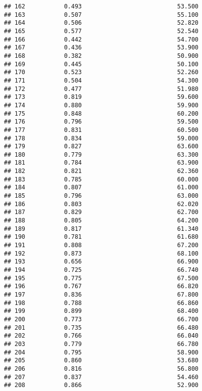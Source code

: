 \documentclass[
]{article}
\begin{document}
\begin{verbatim}
## 162           0.493                           53.500
## 163           0.507                           55.100
## 164           0.506                           52.820
## 165           0.577                           52.540
## 166           0.442                           54.700
## 167           0.436                           53.900
## 168           0.382                           50.900
## 169           0.445                           50.100
## 170           0.523                           52.260
## 171           0.504                           54.300
## 172           0.477                           51.980
## 173           0.819                           59.600
## 174           0.880                           59.900
## 175           0.848                           60.200
## 176           0.796                           59.500
## 177           0.831                           60.500
## 178           0.834                           59.000
## 179           0.827                           63.600
## 180           0.779                           63.300
## 181           0.784                           63.900
## 182           0.821                           62.360
## 183           0.785                           60.000
## 184           0.807                           61.000
## 185           0.796                           63.000
## 186           0.803                           62.020
## 187           0.829                           62.700
## 188           0.805                           64.200
## 189           0.817                           61.340
## 190           0.781                           61.680
## 191           0.808                           67.200
## 192           0.873                           68.100
## 193           0.656                           66.900
## 194           0.725                           66.740
## 195           0.775                           67.500
## 196           0.767                           66.820
## 197           0.836                           67.800
## 198           0.788                           66.860
## 199           0.899                           68.400
## 200           0.773                           66.700
## 201           0.735                           66.480
## 202           0.766                           66.040
## 203           0.779                           66.780
## 204           0.795                           58.900
## 205           0.860                           53.680
## 206           0.816                           56.800
## 207           0.837                           54.460
## 208           0.866                           52.900

\end{verbatim}
\end{document}
